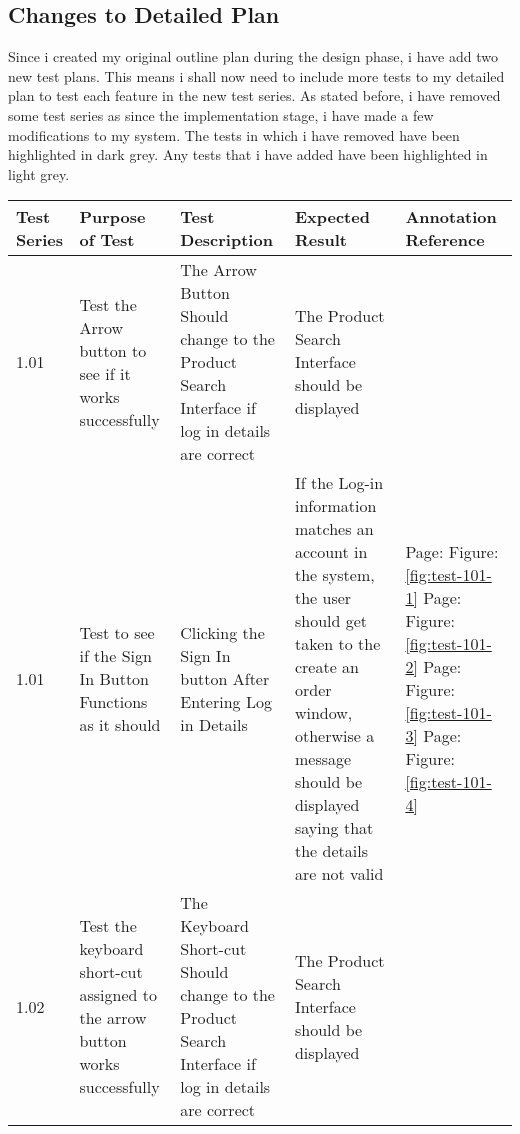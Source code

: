 \pagebreak

\subsection{Changes to Detailed Plan}

Since i created my original outline plan during the design phase, i have add two new test plans. This means i shall now need to include more tests to my detailed plan to test each feature in the new test series. As stated before, i have removed some test series as since the implementation stage, i have made a few modifications to my system. The tests in which i have removed have been highlighted in dark grey. Any tests that i have added have been highlighted in light grey.

\begin{flushleft}
\begin{longtable}{|p{1cm}|p{2.5cm}|p{2.5cm}|p{2cm}|p{2cm}|}
        \hline
        \textbf{Test Series} & \textbf{Purpose of Test} & \textbf{Test Description} &  \textbf{Expected Result} & \textbf{Annotation Reference}\\ \hline
	\rowcolor{dark-grey}1.01 & Test the Arrow button to see if it works successfully & The Arrow Button Should change to the Product Search Interface if log in details are correct & The Product Search Interface should be displayed &  \\ \hline
	\rowcolor{light-grey}1.01 & Test to see if the Sign In Button Functions as it should & Clicking the Sign In  button After Entering Log in Details & If the Log-in information matches an account in the system, the user should get taken to the create an order window, otherwise a message should be displayed saying that the details are not valid & Page: \pageref{fig:test-101-1} \newline Figure: \ref{fig:test-101-1} \newline \newline Page: \pageref{fig:test-101-2} \newline Figure: \ref{fig:test-101-2} \newline \newline Page: \pageref{fig:test-101-3} \newline Figure: \ref{fig:test-101-3} \newline \newline Page: \pageref{fig:test-101-4} \newline Figure: \ref{fig:test-101-4} \\ \hline
	\rowcolor{dark-grey}1.02 & Test the keyboard short-cut assigned to the arrow button works successfully & The Keyboard Short-cut Should change to the Product Search Interface if log in details are correct &The Product Search Interface should be displayed &  \\ \hline

\end{longtable}
\end{flushleft}
